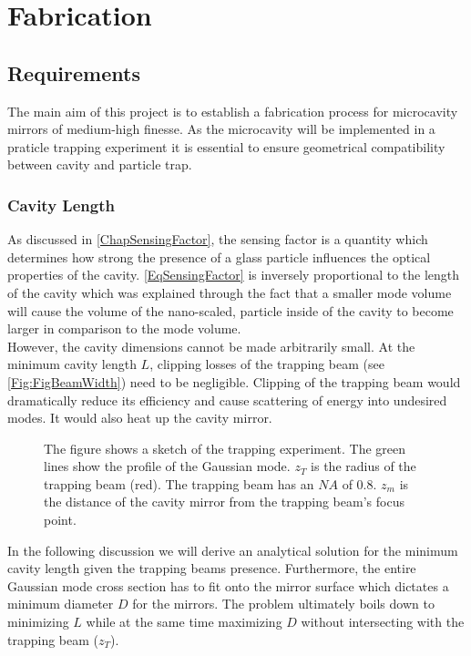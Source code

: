 \chapter{Fabrication}
\section{Requirements}
The main aim of this project is to establish a fabrication process for microcavity mirrors of medium-high finesse. As the microcavity will be implemented in a praticle trapping experiment it is essential to ensure geometrical compatibility between cavity and particle trap.

\subsection{Cavity Length}\label{ChapCavityLength}
As discussed in \autoref{ChapSensingFactor}, the sensing factor is a quantity which determines how strong the presence of a glass particle influences the optical properties of the cavity. \autoref{EqSensingFactor} is inversely proportional to the length of the cavity which was explained through the fact that a smaller mode volume will cause the volume of the nano-scaled, particle inside of the cavity to become larger in comparison to the mode volume.\\
However, the cavity dimensions cannot be made arbitrarily small. At the minimum cavity length $L$, clipping losses of the trapping beam (see \autoref{Fig:FigBeamWidth}) need to be negligible. Clipping of the trapping beam would dramatically reduce its efficiency and cause scattering of energy into undesired modes. It would also heat up the cavity mirror.\\
\begin{figure}[H]
	
	\caption{The figure shows a sketch of the trapping experiment. The green lines show the profile of the Gaussian mode. $z_{\si{T}}$ is the radius of the trapping beam (red). The trapping beam has an $\si{NA}$ of $0.8$. $z_{\si{m}}$ is the distance of the cavity mirror from the trapping beam's focus point.}
	\label{Fig:FigBeamWidth}
\end{figure}
In the following discussion we will derive an analytical solution for the minimum cavity length given the trapping beams presence. Furthermore, the entire Gaussian mode cross section has to fit onto the mirror surface which dictates a minimum diameter $D$ for the mirrors. The problem ultimately boils down to minimizing $L$ while at the same time maximizing $D$ without intersecting with the trapping beam ($z_{\si{T}}$).\\
